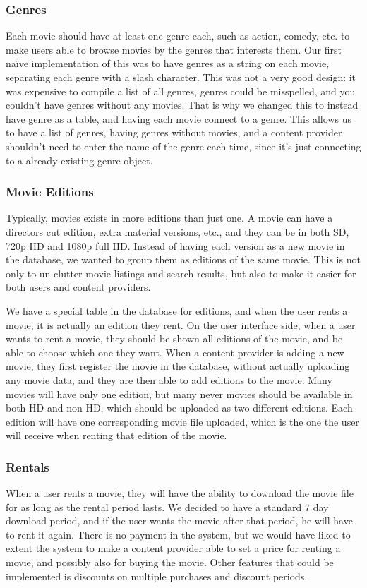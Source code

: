 \subsubsection{Genres}
\label{Design_Service_Analysis_Genres}
Each movie should have at least one genre each, such as action, comedy, etc. to make users able to browse movies by the genres that interests them. Our first naïve implementation of this was to have genres as a string on each movie, separating each genre with a slash character. This was not a very good design: it was expensive to compile a list of all genres, genres could be misspelled, and you couldn't have genres without any movies. That is why we changed this to instead have genre as a table, and having each movie connect to a genre. This allows us to have a list of genres, having genres without movies, and a content provider shouldn't need to enter the name of the genre each time, since it's just connecting to a already-existing genre object.

\subsubsection{Movie Editions}
\label{Design_Service_Analysis_MovieEditions}
Typically, movies exists in more editions than just one. A movie can have a directors cut edition, extra material versions, etc., and they can be in both SD, 720p HD and 1080p full HD. Instead of having each version as a new movie in the database, we wanted to group them as editions of the same movie. This is not only to un-clutter movie listings and search results, but also to make it easier for both users and content providers.

We have a special table in the database for editions, and when the user rents a movie, it is actually an edition they rent. On the user interface side, when a user wants to rent a movie, they should be shown all editions of the movie, and be able to choose which one they want. When a content provider is adding a new movie, they first register the movie in the database, without actually uploading any movie data, and they are then able to add editions to the movie. Many movies will have only one edition, but many never movies should be available in both HD and non-HD, which should be uploaded as two different editions. Each edition will have one corresponding movie file uploaded, which is the one the user will receive when renting that edition of the movie.

\subsubsection{Rentals}
\label{Design_Service_Analysis_Rentals}
When a user rents a movie, they will have the ability to download the movie file for as long as the rental period lasts. We decided to have a standard 7 day download period, and if the user wants the movie after that period, he will have to rent it again. There is no payment in the system, but we would have liked to extent the system to make a content provider able to set a price for renting a movie, and possibly also for buying the movie. Other features that could be implemented is discounts on multiple purchases and discount periods.

